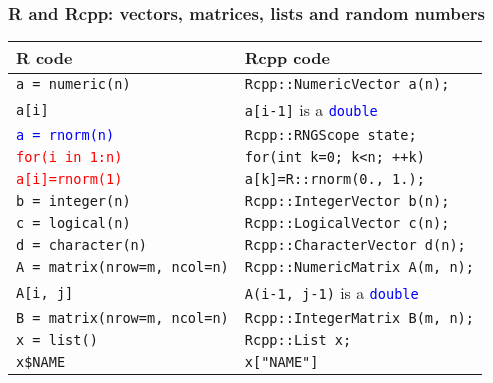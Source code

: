 \documentclass[11pt,pdftex,dvipsnames,usenames,helvetica]{beamer}
\begin{document}
\begin{frame}[fragile]
\frametitle{R and Rcpp: vectors, matrices, lists and random numbers}
\begin{center}
\begin{tabular}{l|l}
R code & Rcpp code \\ \hline
{\tt a = numeric(n)} & {\tt Rcpp::NumericVector a(n);}\\
{\tt a[i]}           & {\tt a[i-1]} is a \textcolor{blue}{\tt double}\\
\textcolor{blue}{\tt a = rnorm(n)}  & {\tt Rcpp::RNGScope state;}\\
\textcolor{red}{\tt for(i in 1:n)} & {\tt for(int k=0; k<n; ++k)}\\
\textcolor{red}{\tt\quad a[i]=rnorm(1)} & {\tt\quad a[k]=R::rnorm(0., 1.);}\\
{\tt b = integer(n)} & {\tt Rcpp::IntegerVector b(n);}\\
{\tt c = logical(n)} & {\tt Rcpp::LogicalVector c(n);}\\
{\tt d = character(n)} & {\tt Rcpp::CharacterVector d(n);} \\
{\tt A = matrix(nrow=m, ncol=n)} & {\tt Rcpp::NumericMatrix A(m, n);}\\
{\tt A[i, j]}       & {\tt A(i-1, j-1)} is a \textcolor{blue}{\tt double}\\
{\tt B = matrix(nrow=m, ncol=n)} & {\tt Rcpp::IntegerMatrix B(m, n);}\\
{\tt x = list()}    & {\tt Rcpp::List x;}\\
{\tt x\$NAME}       & {\tt x["NAME"]}\\
\end{tabular}
\end{center}
\end{frame}
\end{document}
